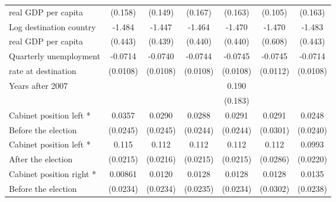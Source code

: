 \begin{table}[htbp]
\begin{tabular}{l*{6}{c}}
real GDP per capita     &     (0.158)         &     (0.149)                 &     (0.167)         &     (0.163)         &     (0.105)         &     (0.163)         \\
[0,5em]
Log destination country &      -1.484\sym{**} &      -1.447\sym{**} &      -1.464\sym{**} &      -1.470\sym{**} &      -1.470\sym{*}  &      -1.483\sym{**} \\
real GDP per capita     &     (0.443)         &     (0.439)         &     (0.440)         &     (0.440)         &     (0.608)         &     (0.443)         \\
[0,5em]
Quarterly unemployment &     -0.0714\sym{***}&     -0.0740\sym{***}&     -0.0744\sym{***}&     -0.0745\sym{***}&     -0.0745\sym{***}&     -0.0714\sym{***}\\
rate at destination    &    (0.0108)         &    (0.0108)         &    (0.0108)         &    (0.0108)         &    (0.0112)         &    (0.0108)         \\
[0,5em]
Years after 2007          &                     &                     &                     &       0.190         &                     &                     \\
                    &                     &                     &                     &     (0.183)         &                     &                     \\
[0,5em]
Cabinet position left * &      0.0357         &      0.0290         &      0.0288         &      0.0291         &      0.0291         &      0.0248         \\
Before the election                    &    (0.0245)         &    (0.0245)         &    (0.0244)         &    (0.0244)         &    (0.0301)         &    (0.0240)         \\
[0,5em]
Cabinet position left * &       0.115\sym{***}&       0.112\sym{***}&       0.112\sym{***}&       0.112\sym{***}&       0.112\sym{***}&      0.0993\sym{***}\\
After the election                    &    (0.0215)         &    (0.0216)         &    (0.0215)         &    (0.0215)         &    (0.0286)         &    (0.0220)         \\
[0,5em]
Cabinet position right * &     0.00861         &      0.0120         &      0.0128         &      0.0128         &      0.0128         &      0.0135         \\
Before the election                    &    (0.0234)         &    (0.0234)         &    (0.0235)         &    (0.0234)         &    (0.0302)         &    (0.0238)         \\

\end{tabular}
\end{table}
